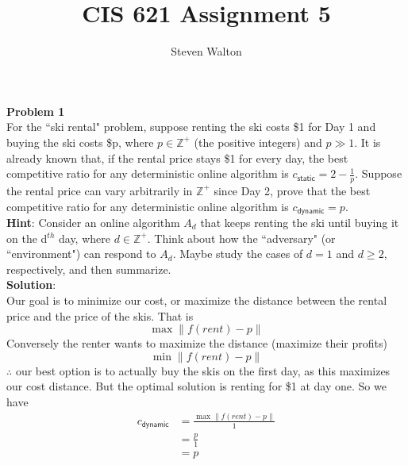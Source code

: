 \documentclass[12pt,letter]{article}
\newcommand{\problem}[1]{\vspace{3mm}\Large\textbf{{Problem {#1}\vspace{3mm}}}\normalsize\\}
\begin{document}
\title{CIS 621 Assignment 5}
\author{Steven Walton}
\maketitle
\problem{1}
For the ``ski rental" problem, suppose renting the ski costs \$1 for Day 1 and 
buying the ski costs \$p, where $p\in\mathbb{Z}^+$ (the positive integers)
and $p\gg1$. It is already known that, if the rental price stays \$1 for every
day, the best competitive ratio for any deterministic online algorithm is
$c_\mathsf{static} = 2-\frac1p$. Suppose the rental price can vary arbitrarily 
in $\mathbb{Z}^+$ since Day 2, prove that the best competitive ratio for any 
deterministic online algorithm is $c_\mathsf{dynamic} = p$.
\\

\textbf{Hint}: Consider an online algorithm $A_d$ that keeps renting the ski 
until buying it on the d$^{th}$ day, where $d\in\mathbb{Z}^+$. Think about
how the ``adversary" (or ``environment") can respond to $A_d$. Maybe study the
cases of $d=1$ and $d\geq 2$, respectively, and then summarize.
\\

\textbf{Solution}:\\
Our goal is to minimize our cost, or maximize the distance between the rental 
price and the price of the skis. That is
\[
    \max\|f(rent)-p\|
\]
Conversely the renter wants to maximize the distance (maximize their profits)
\[
    \min\|f(rent)-p\|
\]
$\therefore$ our best option is to actually buy the skis on the first day, as
this maximizes our cost distance. But the optimal solution is renting for
\$1 at day one. So we have
\begin{align*}
    c_{\mathsf{dynamic}} &=\frac{\max\|f(rent)-p\|}{1}\\
    &= \frac{p}{1}\\
    &= p
\end{align*}
\end{document}

